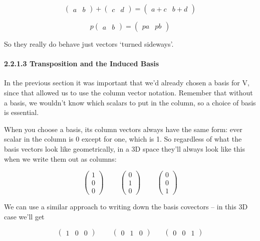\documentclass[oneside,english]{amsbook}
\numberwithin{section}{chapter}
\theoremstyle{plain}
\theoremstyle{definition}
\begin{document}
\[\begin{pmatrix}
	a & b
\end{pmatrix} + \begin{pmatrix}
	c & d
\end{pmatrix} = \begin{pmatrix}
	a + c & b + d
\end{pmatrix}\]

\[p\begin{pmatrix}
	a & b
\end{pmatrix} = \begin{pmatrix}
	pa & pb
\end{pmatrix}\]

So they really do behave just vectors `turned sideways'.

\paragraph{2.2.1.3 Transposition and the Induced
	Basis}\label{transposition-and-the-induced-basis}

In the previous section it was important that we'd already chosen a
basis for V, since that allowed us to use the column vector notation.
Remember that without a basis, we wouldn't know which scalars to put in
the column, so a choice of basis is essential.

When you choose a basis, its column vectors always have the same form:
ever scalar in the column is 0 except for one, which is 1. So regardless
of what the basis vectors look like geometrically, in a 3D space they'll
always look like this when we write them out as columns:

\[\begin{pmatrix}
	1 \\
	0 \\
	0
\end{pmatrix}\ \ \ \ \ \ \ \ \ \ \begin{pmatrix}
	0 \\
	1 \\
	0
\end{pmatrix}\ \ \ \ \ \ \ \ \ \ \begin{pmatrix}
	0 \\
	0 \\
	1
\end{pmatrix}\]

We can use a similar approach to writing down the basis covectors -- in
this 3D case we'll get

\[\begin{pmatrix}
	1 & 0 & 0
\end{pmatrix}\ \ \ \ \ \ \ \ \ \ \begin{pmatrix}
	0 & 1 & 0
\end{pmatrix}\ \ \ \ \ \ \ \ \begin{pmatrix}
	0 & 0 & 1
\end{pmatrix}\]
\end{document}
